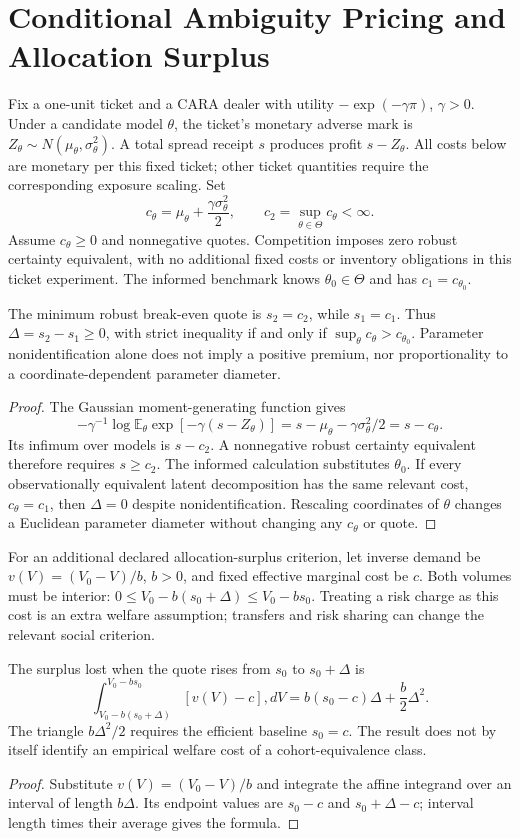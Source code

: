 
\section{Conditional Ambiguity Pricing and Allocation Surplus}
Fix a one-unit ticket and a CARA dealer with utility $-\exp(-\gamma\pi)$, $\gamma>0$. Under a candidate model $\theta$, the ticket's monetary adverse mark is $Z_\theta\sim N(\mu_\theta,\sigma_\theta^2)$. A total spread receipt $s$ produces profit $s-Z_\theta$. All costs below are monetary per this fixed ticket; other ticket quantities require the corresponding exposure scaling. Set
\[
c_\theta=\mu_\theta+\frac{\gamma\sigma_\theta^2}{2},\qquad
c_2=\sup_{\theta\in\Theta}c_\theta<\infty.
\]
Assume $c_\theta\ge0$ and nonnegative quotes. Competition imposes zero robust certainty equivalent, with no additional fixed costs or inventory obligations in this ticket experiment. The informed benchmark knows $\theta_0\in\Theta$ and has $c_1=c_{\theta_0}$.
\begin{proposition}
The minimum robust break-even quote is $s_2=c_2$, while $s_1=c_1$. Thus $\Delta=s_2-s_1\ge0$, with strict inequality if and only if $\sup_\theta c_\theta>c_{\theta_0}$. Parameter nonidentification alone does not imply a positive premium, nor proportionality to a coordinate-dependent parameter diameter.
\end{proposition}
\begin{proof}
The Gaussian moment-generating function gives
\[
-\gamma^{-1}\log\mathbb E_\theta\exp[-\gamma(s-Z_\theta)]
=s-\mu_\theta-\gamma\sigma_\theta^2/2=s-c_\theta.
\]
Its infimum over models is $s-c_2$. A nonnegative robust certainty equivalent therefore requires $s\ge c_2$. The informed calculation substitutes $\theta_0$. If every observationally equivalent latent decomposition has the same relevant cost, $c_\theta=c_1$, then $\Delta=0$ despite nonidentification. Rescaling coordinates of $\theta$ changes a Euclidean parameter diameter without changing any $c_\theta$ or quote.
\end{proof}

For an additional declared allocation-surplus criterion, let inverse demand be $v(V)=(V_0-V)/b$, $b>0$, and fixed effective marginal cost be $c$. Both volumes must be interior: $0\le V_0-b(s_0+\Delta)\le V_0-bs_0$. Treating a risk charge as this cost is an extra welfare assumption; transfers and risk sharing can change the relevant social criterion.
\begin{proposition}
The surplus lost when the quote rises from $s_0$ to $s_0+\Delta$ is
\[
\int_{V_0-b(s_0+\Delta)}^{V_0-bs_0}[v(V)-c],dV
=b(s_0-c)\Delta+\frac b2\Delta^2.
\]
The triangle $b\Delta^2/2$ requires the efficient baseline $s_0=c$. The result does not by itself identify an empirical welfare cost of a cohort-equivalence class.
\end{proposition}
\begin{proof}
Substitute $v(V)=(V_0-V)/b$ and integrate the affine integrand over an interval of length $b\Delta$. Its endpoint values are $s_0-c$ and $s_0+\Delta-c$; interval length times their average gives the formula.
\end{proof}

